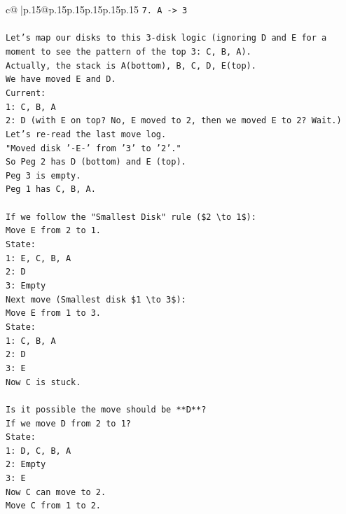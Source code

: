 \documentclass{article}
\begin{document}
{\begin{supertabular}{c@{$\;$}|p{.15\linewidth}@{}p{.15\linewidth}p{.15\linewidth}p{.15\linewidth}p{.15\linewidth}p{.15\linewidth}}
{{{\texttt{7. A {-}> 3} \\
\\ 
\texttt{Let's map our disks to this 3{-}disk logic (ignoring D and E for a moment to see the pattern of the top 3: C, B, A).} \\
\texttt{Actually, the stack is A(bottom), B, C, D, E(top).} \\
\texttt{We have moved E and D.} \\
\texttt{Current:} \\
\texttt{1: C, B, A} \\
\texttt{2: D (with E on top? No, E moved to 2, then we moved E to 2? Wait.)} \\
\texttt{Let's re{-}read the last move log.} \\
\texttt{"Moved disk '{-}E{-}' from '3' to '2'."} \\
\texttt{So Peg 2 has D (bottom) and E (top).} \\
\texttt{Peg 3 is empty.} \\
\texttt{Peg 1 has C, B, A.} \\
\\ 
\texttt{If we follow the "Smallest Disk" rule (\$2 \textbackslash{}to 1\$):} \\
\texttt{Move E from 2 to 1.} \\
\texttt{State:} \\
\texttt{1: E, C, B, A} \\
\texttt{2: D} \\
\texttt{3: Empty} \\
\texttt{Next move (Smallest disk \$1 \textbackslash{}to 3\$):} \\
\texttt{Move E from 1 to 3.} \\
\texttt{State:} \\
\texttt{1: C, B, A} \\
\texttt{2: D} \\
\texttt{3: E} \\
\texttt{Now C is stuck.} \\
\\ 
\texttt{Is it possible the move should be **D**?} \\
\texttt{If we move D from 2 to 1?} \\
\texttt{State:} \\
\texttt{1: D, C, B, A} \\
\texttt{2: Empty} \\
\texttt{3: E} \\
\texttt{Now C can move to 2.} \\
\texttt{Move C from 1 to 2.} \\
}}}
\end{supertabular}}
\end{document}
